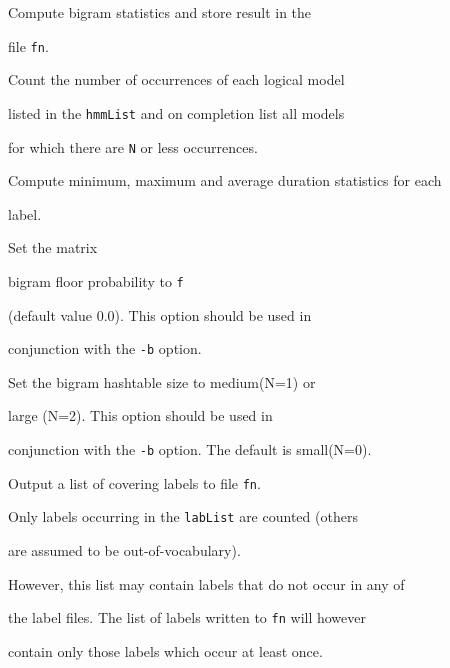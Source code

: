 \begin{optlist}





   Compute bigram statistics and store result in the


        file {\tt fn}.


  


   Count the number of occurrences of each logical model


    listed in the {\tt hmmList} and on completion list all models


    for which there are {\tt N} or less occurrences.





   Compute minimum, maximum and average duration statistics for each


        label.





   Set the matrix


      bigram floor probability to {\tt f} 


     (default value 0.0).  This option should be used in 


     conjunction with the {\tt -b} option.





   Set the bigram hashtable size to medium(N=1) or


        large (N=2).   This option should be used in 


        conjunction with the {\tt -b} option. The default is small(N=0).





    Output a list of covering labels to file {\tt fn}.


        Only labels occurring in the {\tt labList} are counted (others


        are assumed to be out-of-vocabulary).  


        However, this list may contain labels that do not occur in any of


        the label files.  The list of labels written to {\tt fn} will however


        contain only those labels which occur at least once.






\end{optlist}
